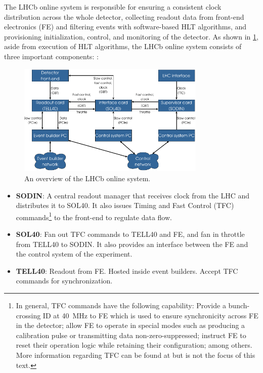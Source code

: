 The LHCb online system is responsible for ensuring a consistent clock
distribution across the whole detector, collecting readout data from front-end
electronics (FE) and filtering events with software-based HLT algorithms,
and provisioning initialization, control, and monitoring of the detector.
As shown in \cref{fig:lhcb-online},
aside from execution of HLT algorithms,
the LHCb online system consists of three important components:
\cite{Colombo_2018}:

\begin{figure}[!htb]
    \centering
    \includegraphics[width=0.8\textwidth]{./figs-ut-upgrade/online/lhcb_online_sys_overview.pdf}
    \caption{
        An overview of the LHCb online system.
    }
    \label{fig:lhcb-online}
\end{figure}

\begin{itemize}
    \item \textbf{SODIN}:
        A central readout manager that receives clock from the LHC and
        distributes it to SOL40.
        It also issues Timing and Fast Control (TFC) commands\footnote{
            In general, TFC commands have the following capability:
            Provide a bunch-crossing ID at 40~MHz to FE which is used to ensure
            synchronicity across FE in the detector;
            allow FE to operate in special modes such as producing a calibration
            pulse or transmitting data non-zero-suppressed;
            instruct FE to reset their operation logic while retaining their
            configuration;
            among others.
            More information regarding TFC can be found at
            \cite{Alessio:1424363} but is not the focus of this text.
        } to the front-end to regulate data flow.

    \item \textbf{SOL40}:
        Fan out TFC commands to TELL40 and FE,
        and fan in throttle from TELL40 to SODIN.
        It also provides an interface between the FE and the control system of
        the experiment.

    \item \textbf{TELL40}:
        Readout from FE. Hosted inside event builders.
        Accept TFC commands for synchronization.
\end{itemize}

